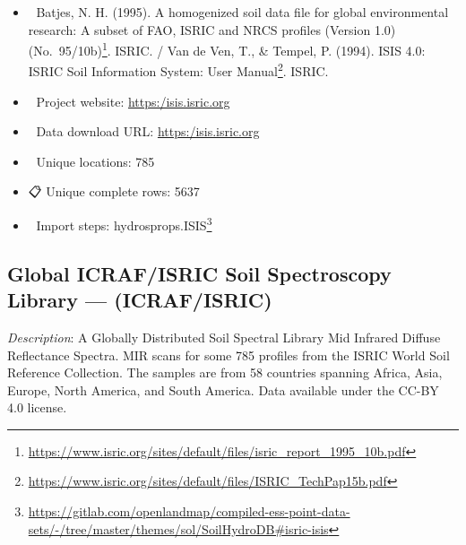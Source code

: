 \documentclass[
  graybox,natbib,nospthms]{svmono}
\providecommand{\tightlist}{%
  \setlength{\itemsep}{0pt}\setlength{\parskip}{0pt}}
\providecommand{\tightlist}{\setlength{\itemsep}{0pt}\setlength{\parskip}{0pt}}
\renewcommand{\href}[2]{#2 (\url{#1})}
\renewcommand{\href}[2]{#2\footnote{\url{#1}}}
\begin{document}
\begin{itemize}
\tightlist
\item
  📕 Batjes, N. H. (1995). \href{https://www.isric.org/sites/default/files/isric_report_1995_10b.pdf}{A homogenized soil data file for global
  environmental research: A subset of FAO, ISRIC and NRCS profiles (Version 1.0) (No.~95/10b)}. ISRIC. / Van de Ven, T., \& Tempel, P. (1994). \href{https://www.isric.org/sites/default/files/ISRIC_TechPap15b.pdf}{ISIS 4.0: ISRIC Soil Information System: User Manual}. ISRIC.\\
\item
  🔗 Project website: \url{https:/isis.isric.org}\\
\item
  📂 Data download URL: \url{https:/isis.isric.org}\\
\item
  📍 Unique locations: 785\\
\item
  📋 Unique complete rows: 5637\\
\item
  📝 Import steps: \href{https://gitlab.com/openlandmap/compiled-ess-point-data-sets/-/tree/master/themes/sol/SoilHydroDB\#isric-isis}{hydrosprops.ISIS}
\end{itemize}

\hypertarget{global-icrafisric-soil-spectroscopy-library-icrafisric}{%
\subsection{Global ICRAF/ISRIC Soil Spectroscopy Library --- (ICRAF/ISRIC)}\label{global-icrafisric-soil-spectroscopy-library-icrafisric}}

\emph{Description}: A Globally Distributed Soil Spectral Library Mid Infrared Diffuse
Reflectance Spectra. MIR scans for some 785 profiles from the ISRIC World Soil Reference Collection.
The samples are from 58 countries spanning Africa, Asia, Europe, North America, and South America.
Data available under the CC-BY 4.0 license.
\end{document}
